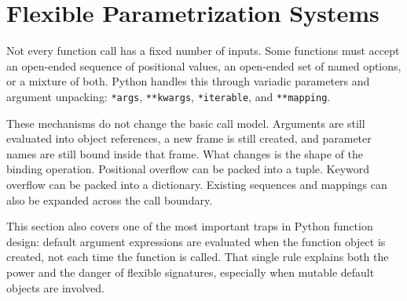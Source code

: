 \section{Flexible Parametrization Systems}

Not every function call has a fixed number of inputs. Some functions must accept an open-ended sequence of positional values, an open-ended set of named options, or a mixture of both. Python handles this through variadic parameters and argument unpacking: \texttt{*args}, \texttt{**kwargs}, \texttt{*iterable}, and \texttt{**mapping}.

These mechanisms do not change the basic call model. Arguments are still evaluated into object references, a new frame is still created, and parameter names are still bound inside that frame. What changes is the shape of the binding operation. Positional overflow can be packed into a tuple. Keyword overflow can be packed into a dictionary. Existing sequences and mappings can also be expanded across the call boundary.

This section also covers one of the most important traps in Python function design: default argument expressions are evaluated when the function object is created, not each time the function is called. That single rule explains both the power and the danger of flexible signatures, especially when mutable default objects are involved.